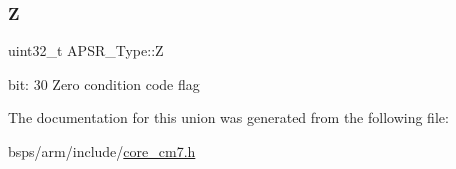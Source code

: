 \subsubsection{\texorpdfstring{Z}{Z}}
{\footnotesize\ttfamily uint32\+\_\+t A\+P\+S\+R\+\_\+\+Type\+::Z}

bit\+: 30 Zero condition code flag 

The documentation for this union was generated from the following file\+:\begin{DoxyCompactItemize}
\item 
bsps/arm/include/\mbox{\hyperlink{core__cm7_8h}{core\+\_\+cm7.\+h}}\end{DoxyCompactItemize}
